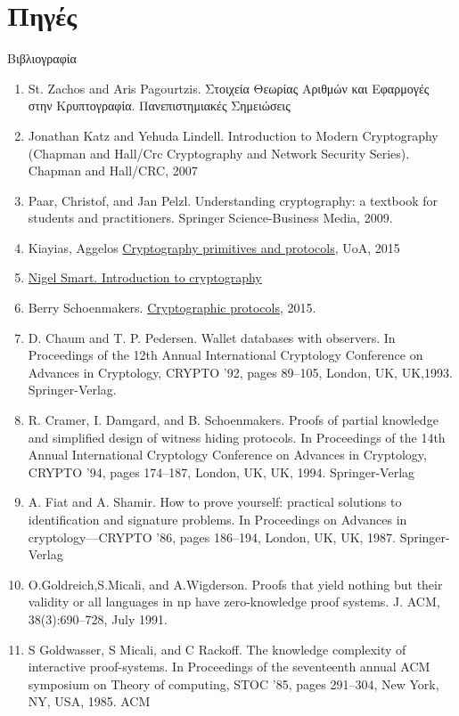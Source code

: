 \documentclass[handout]{beamer}
\begin{document}
\section{Πηγές}
\begin{frame}[allowframebreaks]{Βιβλιογραφία}
\begin{tiny}
\begin{enumerate}
\item St. Zachos and Aris Pagourtzis. Στοιχεία Θεωρίας Αριθμών και Εφαρμογές στην Κρυπτογραφία. Πανεπιστημιακές Σημειώσεις
\item Jonathan Katz and Yehuda Lindell. Introduction to Modern Cryptography (Chapman and Hall/Crc Cryptography and Network Security Series). Chapman
and Hall/CRC, 2007
\item Paar, Christof, and Jan Pelzl. Understanding cryptography: a textbook for students and practitioners. Springer Science-Business Media, 2009.
\item Kiayias, Aggelos  \href{http://crypto.di.uoa.gr/class/Kryptographia/Semeioseis_files/Cryptograph_Primitives_and_Protocols.pdf}{Cryptography primitives and protocols}, UoA, 2015
\item \href{http://goo.gl/b75I29}{Nigel Smart. Introduction to cryptography}
\item Berry Schoenmakers. \href{http://www.win.tue.nl/~berry/2WC13/}{Cryptographic protocols}, 2015. 
\medskip
\item  D. Chaum and T. P. Pedersen. Wallet databases with observers. In Proceedings of the 12th Annual International Cryptology Conference on Advances in Cryptology, CRYPTO ’92, pages 89–105, London, UK, UK,1993. Springer-Verlag.
\item R. Cramer, I. Damgard, and B. Schoenmakers. Proofs of partial knowledge and simplified design of witness hiding protocols. In Proceedings of the 14th Annual International Cryptology Conference on Advances in Cryptology, CRYPTO ’94, pages 174–187, London, UK, UK, 1994. Springer-Verlag
\item A. Fiat and A. Shamir. How to prove yourself: practical solutions to identification and signature problems. In Proceedings on Advances in cryptology—CRYPTO ’86, pages 186–194, London, UK, UK, 1987. Springer-Verlag
\item O.Goldreich,S.Micali, and A.Wigderson. Proofs that yield nothing but their validity or all languages in np have zero-knowledge proof systems. J. ACM, 38(3):690–728, July 1991.
\item S Goldwasser, S Micali, and C Rackoff. The knowledge complexity of interactive proof-systems. In Proceedings of the seventeenth annual ACM symposium on Theory of computing, STOC ’85, pages 291–304, New York, NY, USA, 1985. ACM

\end{enumerate}
\end{tiny}
\end{frame}
\end{document}
